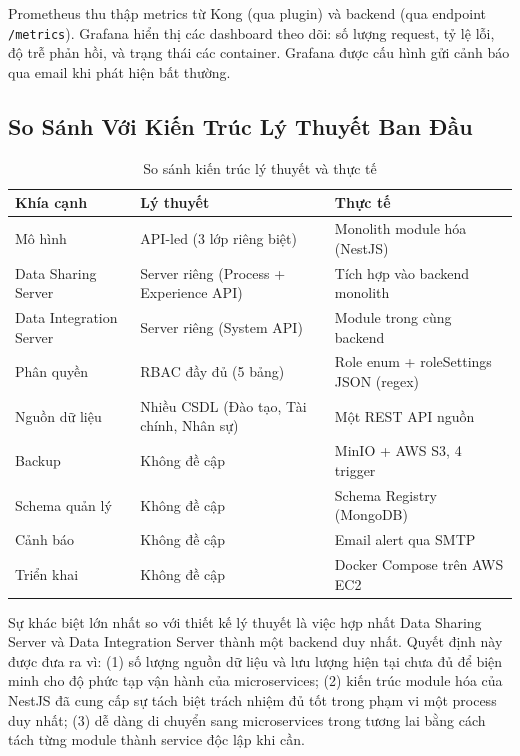 Prometheus thu thập metrics từ Kong (qua plugin) và backend (qua endpoint
\texttt{/metrics}). Grafana hiển thị các dashboard theo dõi: số lượng
request, tỷ lệ lỗi, độ trễ phản hồi, và trạng thái các container.
Grafana được cấu hình gửi cảnh báo qua email khi phát hiện bất thường.

\subsection{So Sánh Với Kiến Trúc Lý Thuyết Ban Đầu}

\begin{table}[H]
\centering
\caption{So sánh kiến trúc lý thuyết và thực tế}
\label{tab:arch-compare}
\renewcommand{\arraystretch}{1.4}
\begin{tabular}{|p{4cm}|p{5cm}|p{5cm}|}
\hline
\textbf{Khía cạnh} & \textbf{Lý thuyết} & \textbf{Thực tế} \\
\hline
Mô hình & API-led (3 lớp riêng biệt) &
    Monolith module hóa (NestJS) \\
\hline
Data Sharing Server & Server riêng (Process + Experience API) &
    Tích hợp vào backend monolith \\
\hline
Data Integration Server & Server riêng (System API) &
    Module trong cùng backend \\
\hline
Phân quyền & RBAC đầy đủ (5 bảng) &
    Role enum + roleSettings JSON (regex) \\
\hline
Nguồn dữ liệu & Nhiều CSDL (Đào tạo, Tài chính, Nhân sự) &
    Một REST API nguồn \\
\hline
Backup & Không đề cập &
    MinIO + AWS S3, 4 trigger \\
\hline
Schema quản lý & Không đề cập &
    Schema Registry (MongoDB) \\
\hline
Cảnh báo & Không đề cập &
    Email alert qua SMTP \\
\hline
Triển khai & Không đề cập &
    Docker Compose trên AWS EC2 \\
\hline
\end{tabular}
\end{table}

Sự khác biệt lớn nhất so với thiết kế lý thuyết là việc hợp nhất Data
Sharing Server và Data Integration Server thành một backend duy nhất.
Quyết định này được đưa ra vì: (1) số lượng nguồn dữ liệu và lưu lượng
hiện tại chưa đủ để biện minh cho độ phức tạp vận hành của
microservices; (2) kiến trúc module hóa của NestJS đã cung cấp sự tách
biệt trách nhiệm đủ tốt trong phạm vi một process duy nhất; (3) dễ dàng
di chuyển sang microservices trong tương lai bằng cách tách từng module
thành service độc lập khi cần.
